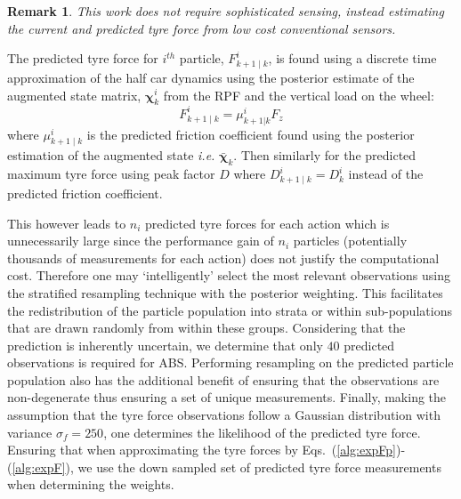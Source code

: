 \documentclass[onecolumn,journal,draftclsnofoot]{IEEEtran}
\newtheorem{remark}{Remark}
\begin{document}
\begin{remark}
    This work does not require sophisticated sensing, instead estimating the current and predicted tyre force from low cost conventional sensors.
\end{remark}

The predicted tyre force for $i^{th}$ particle, \({{F}}_{k+1 \mid k}^i\), is found using a discrete time approximation of the half car dynamics using the posterior estimate of the augmented state matrix, \(\mathbf{\chi}_{k}^i\) from the RPF and the vertical load on the wheel:
 \begin{equation}
    {{F}}_{k+1 \mid k}^i = \mu_{k+1|k}^i F_{z}
\end{equation}
where \(\mu_{k+1 \mid k}^i\) is the predicted friction coefficient found using the posterior estimation of the augmented state \emph{i.e.} \(\bar{\mathbf{\chi}}_{k}\). Then similarly for the predicted maximum tyre force using peak factor \(D\) where \(D_{k+1\mid k}^i= D_k^i\) instead of the predicted friction coefficient.

This however leads to \(n_i\) predicted tyre forces for each action %
which is unnecessarily large since the performance gain of \(n_i\) particles (potentially thousands of measurements for each action) does not justify the computational cost. Therefore one may `intelligently' select the most relevant observations using the stratified resampling technique \cite{Li2015} with the posterior weighting. 
This facilitates the redistribution of the particle population into strata or within sub-populations that are drawn randomly from within these groups. Considering that the prediction is inherently uncertain, we determine that only \(40\) predicted observations is required for ABS. 
Performing resampling on the predicted particle population also has the additional benefit of ensuring that the observations are non-degenerate thus ensuring a set of unique measurements.
Finally, making the assumption that the tyre force observations follow a Gaussian distribution with variance \(\sigma_f=250\), one determines the likelihood of the predicted tyre force. Ensuring that when approximating the tyre forces by Eqs.~(\ref{alg:expFp})-(\ref{alg:expF}), we use the down sampled set of predicted tyre force measurements when determining the weights.
\end{document}
